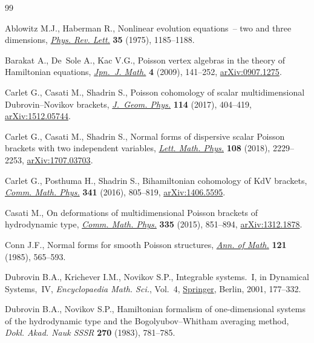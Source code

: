 \begin{thebibliography}{99}
\footnotesize\itemsep=0pt

Ablowitz M.J., Haberman R., Nonlinear evolution equations~-- two and three
 dimensions, \href{https://doi.org/10.1103/PhysRevLett.35.1185}{\textit{Phys. Rev. Lett.}} \textbf{35} (1975), 1185--1188.

Barakat A., De~Sole A., Kac V.G., Poisson vertex algebras in the theory of
 {H}amiltonian equations, \href{https://doi.org/10.1007/s11537-009-0932-y}{\textit{Jpn.~J. Math.}} \textbf{4} (2009), 141--252,
 \href{https://arxiv.org/abs/0907.1275}{arXiv:0907.1275}.

Carlet G., Casati M., Shadrin S., Poisson cohomology of scalar multidimensional
 {D}ubrovin--{N}ovikov brackets, \href{https://doi.org/10.1016/j.geomphys.2016.12.008}{\textit{J.~Geom. Phys.}} \textbf{114} (2017),
 404--419, \href{https://arxiv.org/abs/1512.05744}{arXiv:1512.05744}.

Carlet G., Casati M., Shadrin S., Normal forms of dispersive scalar {P}oisson
 brackets with two independent variables, \href{https://doi.org/10.1007/s11005-018-1076-x}{\textit{Lett. Math. Phys.}}
 \textbf{108} (2018), 2229--2253, \href{https://arxiv.org/abs/1707.03703}{arXiv:1707.03703}.

Carlet G., Posthuma H., Shadrin S., Bihamiltonian cohomology of {K}d{V}
 brackets, \href{https://doi.org/10.1007/s00220-015-2540-4}{\textit{Comm. Math. Phys.}} \textbf{341} (2016), 805--819,
 \href{https://arxiv.org/abs/1406.5595}{arXiv:1406.5595}.

Casati M., On deformations of multidimensional {P}oisson brackets of
 hydrodynamic type, \href{https://doi.org/10.1007/s00220-014-2219-2}{\textit{Comm. Math. Phys.}} \textbf{335} (2015), 851--894,
 \href{https://arxiv.org/abs/1312.1878}{arXiv:1312.1878}.

Conn J.F., Normal forms for smooth {P}oisson structures, \href{https://doi.org/10.2307/1971210}{\textit{Ann. of Math.}}
 \textbf{121} (1985), 565--593.

Dubrovin B.A., Krichever I.M., Novikov S.P., Integrable systems.~{I}, in
 Dynamical {S}ystems,~{IV}, \textit{Encyclopaedia Math. Sci.}, Vol.~4,
 \href{https://doi.org/10.1007/978-3-662-06791-8_3}{Springer}, Berlin, 2001, 177--332.

Dubrovin B.A., Novikov S.P., Hamiltonian formalism of one-dimensional systems
 of the hydrodynamic type and the {B}ogolyubov--{W}hitham averaging method,
 \textit{Dokl. Akad. Nauk SSSR} \textbf{270} (1983), 781--785.


\end{thebibliography}

